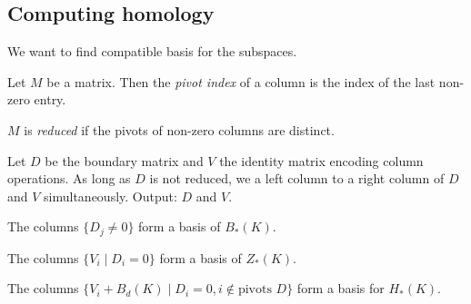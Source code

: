 \begin{multicols*}{3}
\subsection{Computing homology}
{\myfont We want to find compatible basis for the subspaces.} \vspace{-0.5pc}
\begin{defi}[Pivot]
Let $M$ be a matrix. Then the \emph{pivot index} of a column is the index of the last non-zero entry.
\end{defi}
\rspace
\begin{defi}[Reduced]
$M$ is \emph{reduced} if the pivots of non-zero columns are distinct.
\end{defi}
\rspace
\begin{alg} Let $D$ be the boundary matrix and $V$ the identity matrix encoding column operations. As long as $D$ is not reduced, we a left column to a right column  of $D$ and $V$ simultaneously. Output: $D$ and $V$.
\end{alg}
\rspace
\begin{rem} The columns $\{ D_j \neq 0\}$ form a basis of $B_*(K)$.
\end{rem}
\rspace
\begin{rem}
The columns $\{V_i \mid D_i=0\}$ form a basis of $Z_*(K)$. 
 \end{rem}
\rspace
\begin{rem}
The columns $\{V_i+B_d(K) \mid D_i =0, i \notin \text{pivots } D\}$ form a basis for $H_*(K)$.
\end{rem}
\end{multicols*}

